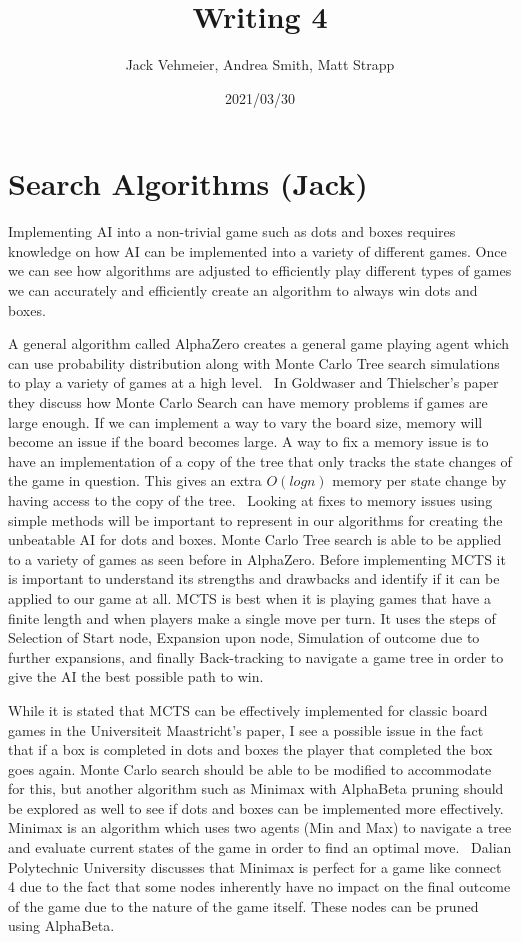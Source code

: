 \documentclass[12pt]{article}
\title{Writing 4}
\author{Jack Vehmeier, Andrea Smith, Matt Strapp}
\date{2021/03/30}
\begin{document}
    \maketitle
    \section*{Search Algorithms (Jack)}
    Implementing AI into a non-trivial game such as dots and boxes requires knowledge on how AI can be implemented into a variety of different games. Once we can see how algorithms are adjusted to efficiently play different types of games we can accurately and efficiently create an algorithm to always win dots and boxes. 
    
    A general algorithm called AlphaZero creates a general game playing agent which can use probability distribution along with Monte Carlo Tree search simulations to play a variety of games at a high level.~\cite{GeneralGame} In Goldwaser and Thielscher's paper they discuss how Monte Carlo Search can have memory problems if games are large enough. If we can implement a way to vary the board size, memory will become an issue if the board becomes large. A way to fix a memory issue is to have an implementation of a copy of the tree that only tracks the state changes of the game in question. This gives an extra \(O(logn)\) memory per state change by having access to the copy of the tree.~\cite{GeneralGame} Looking at fixes to memory issues using simple methods will be important to represent in our algorithms for creating the unbeatable AI for dots and boxes. Monte Carlo Tree search is able to be applied to a variety of games as seen before in AlphaZero. Before implementing MCTS it is important to understand its strengths and drawbacks and identify if it can be applied to our game at all. MCTS is best when it is playing games that have a finite length and when players make a single move per turn. It uses the steps of Selection of Start node, Expansion upon node, Simulation of outcome due to further expansions, and finally Back-tracking to navigate a game tree in order to give the AI the best possible path to win.~\cite{MCTS} 
    
    While it is stated that MCTS can be effectively implemented for classic board games in the Universiteit Maastricht's paper, I see a possible issue in the fact that if a box is completed in dots and boxes the player that completed the box goes again. Monte Carlo search should be able to be modified to accommodate for this, but another algorithm such as Minimax with AlphaBeta pruning should be explored as well to see if dots and boxes can be implemented more effectively. Minimax is an algorithm which uses two agents (Min and Max) to navigate a tree and evaluate current states of the game in order to find an optimal move.~\cite{Minimax} Dalian Polytechnic University discusses that Minimax is perfect for a game like connect 4 due to the fact that some nodes inherently have no impact on the final outcome of the game due to the nature of the game itself. These nodes can be pruned using AlphaBeta. 
    
\end{document}
